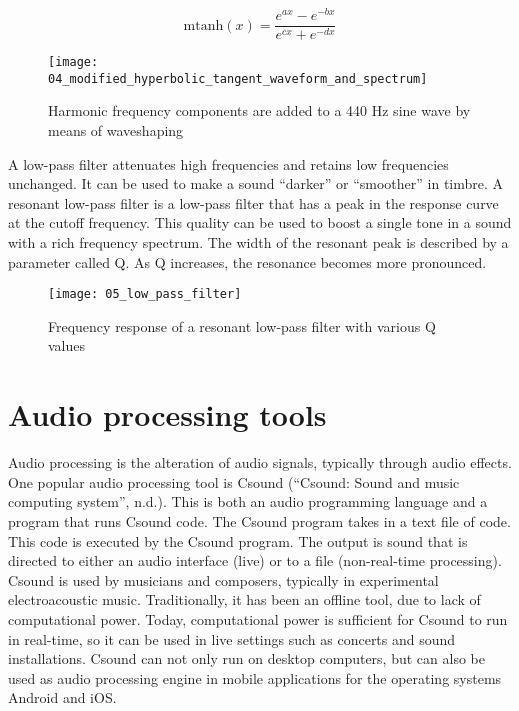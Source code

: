 $$\text{mtanh}(x)=\frac{e^{ax}-e^{-bx}}{e^{cx}+e^{-dx}}$$

\begin{figure}[h]
    \centering
    \texttt{[image: 04\_modified\_hyperbolic\_tangent\_waveform\_and\_spectrum]}
    \caption{Harmonic frequency components are added to a 440 Hz sine wave by means of waveshaping}
    \label{fig:modified_hyperbolic_tangent_waveform_and_spectrum}
\end{figure}

A low-pass filter attenuates high frequencies and retains low frequencies unchanged. It can be used to make a sound “darker” or “smoother” in timbre. A resonant low-pass filter is a low-pass filter that has a peak in the response curve at the cutoff frequency. This quality can be used to boost a single tone in a sound with a rich frequency spectrum. The width of the resonant peak is described by a parameter called Q. As Q increases, the resonance becomes more pronounced.

\begin{figure}[h]
    \centering
    \texttt{[image: 05\_low\_pass\_filter]}
    \caption{Frequency response of a resonant low-pass filter with various Q values}
    \label{fig:low_pass_filter}
\end{figure}

\section{Audio processing tools}
Audio processing is the alteration of audio signals, typically through audio effects. One popular audio processing tool is Csound (“Csound: Sound and music computing system”, n.d.). This is both an audio programming language and a program that runs Csound code. The Csound program takes in a text file of code. This code is executed by the Csound program. The output is sound that is directed to either an audio interface (live) or to a file (non-real-time processing). Csound is used by musicians and composers, typically in experimental electroacoustic music. Traditionally, it has been an offline tool, due to lack of computational power. Today, computational power is sufficient for Csound to run in real-time, so it can be used in live settings such as concerts and sound installations. Csound can not only run on desktop computers, but can also be used as audio processing engine in mobile applications for the operating systems Android and iOS.
